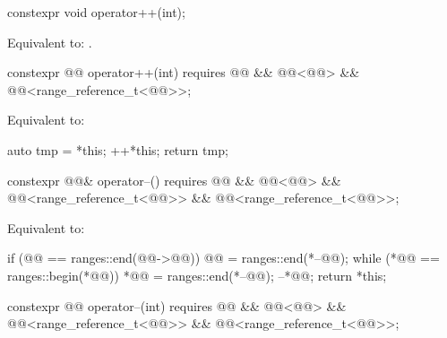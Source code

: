 %
\begin{itemdecl}
constexpr void operator++(int);
\end{itemdecl}

\begin{itemdescr}
\pnum
\effects
Equivalent to: .
\end{itemdescr}

%
\begin{itemdecl}
constexpr @@ operator++(int)
  requires @@ && @@<@@> &&
           @@<range_reference_t<@@>>;
\end{itemdecl}

\begin{itemdescr}
\pnum
\effects
Equivalent to:
\begin{codeblock}
auto tmp = *this;
++*this;
return tmp;
\end{codeblock}
\end{itemdescr}

%
\begin{itemdecl}
constexpr @@& operator--()
  requires @@ && @@<@@> &&
           @@<range_reference_t<@@>> &&
           @@<range_reference_t<@@>>;
\end{itemdecl}

\begin{itemdescr}
\pnum
\effects
Equivalent to:
\begin{codeblock}
if (@@ == ranges::end(@@->@@))
  @@ = ranges::end(*--@@);
while (*@@ == ranges::begin(*@@))
  *@@ = ranges::end(*--@@);
--*@@;
return *this;
\end{codeblock}
\end{itemdescr}

%
\begin{itemdecl}
constexpr @@ operator--(int)
  requires @@ && @@<@@> &&
           @@<range_reference_t<@@>> &&
           @@<range_reference_t<@@>>;
\end{itemdecl}


